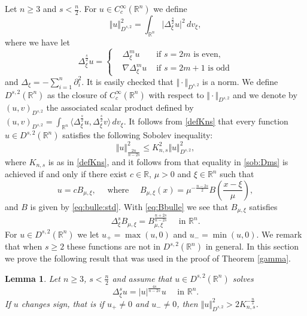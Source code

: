 \documentclass[10pt]{amsart}
\numberwithin{equation}{section}
\newcommand{\R}{\mathbb{R}}
\theoremstyle{plain}
\newtheorem{lemme}{Lemma}[section]%
\theoremstyle{remark}
\begin{document}
Let $n \ge3$ and $s < \frac{n}{2}$. For  $u \in C^\infty_c(\R^n)$ we define 
\begin{equation} \label{normDs2}
 \Vert u \Vert_{D^{s,2}}^2 = \int_{\R^n} \big|\Delta_\xi^{\frac{s}{2}} u  \big|^{2} \, dv_\xi,
 \end{equation}
where we have let 
$$\Delta_\xi^{\frac{s}{2}} u = \left \{ 
\begin{aligned}
& \Delta_\xi^{m } u & \text{ if } s = 2m \text{ is even}, \\
& \nabla  \Delta_\xi^{m } u & \text{ if } s = 2m+1 \text{ is odd}
\end{aligned} \right. $$
and $\Delta_\xi = - \sum_{i=1}^n \partial_i^2$. It is easily checked that $\Vert \cdot \Vert_{D^{s,2}}$ is a norm. We define $D^{s,2}(\R^n)$ as the closure of $C^\infty_c(\R^n)$ with respect to $\Vert \cdot \Vert_{D^{s,2}}$ and we denote by $(u,v)_{D^{s,2}}$ the associated scalar product defined by $(u,v)_{D^{s,2}} = \int_{\R^n} \langle  \Delta_\xi^{\frac{s}{2}} u, \Delta_\xi^{\frac{s}{2}} v \rangle \, dv_\xi$. It follows from \eqref{defKns} that every function $u \in D^{s,2}(\R^n)$ satisfies the following Sobolev inequality: 
\begin{equation} \label{sob:Dms}
\Vert u \Vert_{\frac{2n}{n-2s}}^2 \le K_{n,s}^2 \Vert u \Vert_{D^{s,2}}^2, 
\end{equation}
where $K_{n,s}$ is as in \eqref{defKns}, and it follows from \cite{LiebSharpConstants} that equality in \eqref{sob:Dms} is achieved if and only if there exist $c \in \R$, $\mu > 0$ and $\xi \in \R^n$ such that 
$$u = c B_{\mu, \xi}, \quad \text{ where } \quad B_{\mu,\xi}(x) =  \mu^{- \frac{n-2s}{2}} B \left( \frac{x-\xi}{\mu} \right), $$
and $B$ is given by \eqref{eq:bulle:std}. With \eqref{eq:Bbulle} we see that  $B_{\mu,\xi}$ satisfies 
\begin{equation} \label{annexe:eqB}
 \Delta_\xi^s B_{\mu,\xi} = B_{\mu,\xi}^{\frac{n+2s}{n-2s}} \quad \text{ in } \R^n. 
 \end{equation}
For $u \in D^{s,2}(\R^n)$ we let $u_+ = \max(u,0)$ and $u_- = \min(u,0)$. We remark that when $s \ge 2$ these functions are not in $D^{s,2}(\R^n)$ in general. In this section we prove the following result that was used in the proof of Theorem \ref{gamma}. 



\begin{lemme} \label{lemme:energie:Rn}
Let $n \ge 3$, $s < \frac{n}{2}$ and assume that $u \in D^{s,2}(\R^n)$ solves 
$$ \Delta_\xi^s u = |u|^{\frac{4s}{n-2s}} u \quad \text{ in } \R^n. $$
If $u$ changes sign, that is if $u_+ \neq 0$ and $u_- \neq 0$, then $\Vert u \Vert_{D^{s,2}}^2 > 2 K_{n,s}^{-\frac{n}{s}}$. 
\end{lemme}
\end{document}
